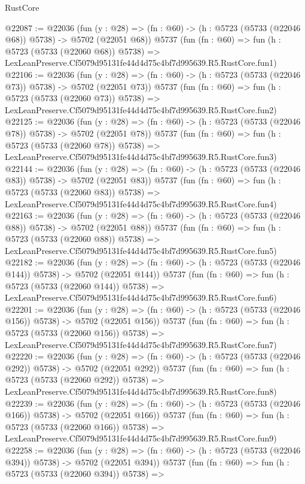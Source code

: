 \begin{lexlean}{RustCore}
\begin{coremodule}
@22087 := @22036
    (fun (y : @28) => (fn : @60) -> (h : @5723 (@5733 (@22046 @68)) @5738) -> @5702 (@22051 @68))
    @5737
    (fun (fn : @60) =>
    fun (h : @5723 (@5733 (@22060 @68)) @5738) =>
    LexLeanPreserve.Cf5079d95131fe44d4d75c4bf7d995639.R5.RustCore.fun1)
@22106 := @22036
    (fun (y : @28) => (fn : @60) -> (h : @5723 (@5733 (@22046 @73)) @5738) -> @5702 (@22051 @73))
    @5737
    (fun (fn : @60) =>
    fun (h : @5723 (@5733 (@22060 @73)) @5738) =>
    LexLeanPreserve.Cf5079d95131fe44d4d75c4bf7d995639.R5.RustCore.fun2)
@22125 := @22036
    (fun (y : @28) => (fn : @60) -> (h : @5723 (@5733 (@22046 @78)) @5738) -> @5702 (@22051 @78))
    @5737
    (fun (fn : @60) =>
    fun (h : @5723 (@5733 (@22060 @78)) @5738) =>
    LexLeanPreserve.Cf5079d95131fe44d4d75c4bf7d995639.R5.RustCore.fun3)
@22144 := @22036
    (fun (y : @28) => (fn : @60) -> (h : @5723 (@5733 (@22046 @83)) @5738) -> @5702 (@22051 @83))
    @5737
    (fun (fn : @60) =>
    fun (h : @5723 (@5733 (@22060 @83)) @5738) =>
    LexLeanPreserve.Cf5079d95131fe44d4d75c4bf7d995639.R5.RustCore.fun4)
@22163 := @22036
    (fun (y : @28) => (fn : @60) -> (h : @5723 (@5733 (@22046 @88)) @5738) -> @5702 (@22051 @88))
    @5737
    (fun (fn : @60) =>
    fun (h : @5723 (@5733 (@22060 @88)) @5738) =>
    LexLeanPreserve.Cf5079d95131fe44d4d75c4bf7d995639.R5.RustCore.fun5)
@22182 := @22036
    (fun (y : @28) => (fn : @60) -> (h : @5723 (@5733 (@22046 @144)) @5738) -> @5702 (@22051 @144))
    @5737
    (fun (fn : @60) =>
    fun (h : @5723 (@5733 (@22060 @144)) @5738) =>
    LexLeanPreserve.Cf5079d95131fe44d4d75c4bf7d995639.R5.RustCore.fun6)
@22201 := @22036
    (fun (y : @28) => (fn : @60) -> (h : @5723 (@5733 (@22046 @156)) @5738) -> @5702 (@22051 @156))
    @5737
    (fun (fn : @60) =>
    fun (h : @5723 (@5733 (@22060 @156)) @5738) =>
    LexLeanPreserve.Cf5079d95131fe44d4d75c4bf7d995639.R5.RustCore.fun7)
@22220 := @22036
    (fun (y : @28) => (fn : @60) -> (h : @5723 (@5733 (@22046 @292)) @5738) -> @5702 (@22051 @292))
    @5737
    (fun (fn : @60) =>
    fun (h : @5723 (@5733 (@22060 @292)) @5738) =>
    LexLeanPreserve.Cf5079d95131fe44d4d75c4bf7d995639.R5.RustCore.fun8)
@22239 := @22036
    (fun (y : @28) => (fn : @60) -> (h : @5723 (@5733 (@22046 @166)) @5738) -> @5702 (@22051 @166))
    @5737
    (fun (fn : @60) =>
    fun (h : @5723 (@5733 (@22060 @166)) @5738) =>
    LexLeanPreserve.Cf5079d95131fe44d4d75c4bf7d995639.R5.RustCore.fun9)
@22258 := @22036
    (fun (y : @28) => (fn : @60) -> (h : @5723 (@5733 (@22046 @394)) @5738) -> @5702 (@22051 @394))
    @5737
    (fun (fn : @60) =>
    fun (h : @5723 (@5733 (@22060 @394)) @5738) =>

\end{coremodule}
\end{lexlean}
